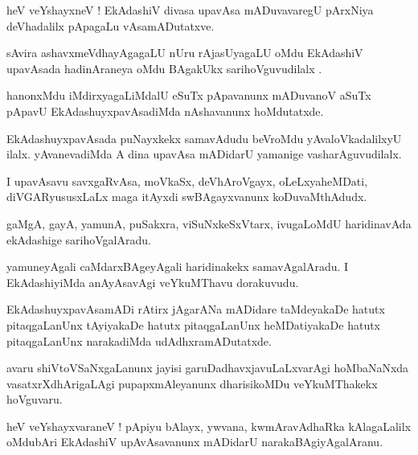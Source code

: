 \documentclass{article}
\begin{document}
\begin{mn}
heV veYshayxneV ! EkAdashiV divasa upavAsa mADuvavaregU pArxNiya deVhadalilx pApagaLu 
vAsamADutatxve.
\end{mn}

\begin{mn}
sAvira ashavxmeVdhayAgagaLU nUru rAjasUyagaLU oMdu EkAdashiV upavAsada hadinAraneya oMdu BAgakUkx 
sarihoVguvudilalx .
\end{mn}

\begin{mn}
hanonxMdu iMdirxyagaLiMdalU eSuTx pApavanunx mADuvanoV aSuTx pApavU EkAdashuyxpavAsadiMda 
nAshavanunx hoMdutatxde.
\end{mn}

\begin{mn}
EkAdashuyxpavAsada puNayxkekx samavAdudu beVroMdu yAvaloVkadalilxyU ilalx. yAvanevadiMda A dina
upavAsa mADidarU yamanige vasharAguvudilalx.
\end{mn}

\begin{mn}
I upavAsavu savxgaRvAsa, moVkaSx, deVhAroVgayx, oLeLxyaheMDati, diVGARyususxLaLx maga itAyxdi 
swBAgayxvanunx koDuvaMthAdudx.
\end{mn}

\begin{mn}
gaMgA, gayA, yamunA, puSakxra, viSuNxkeSxVtarx, ivugaLoMdU haridinavAda ekAdashige sarihoVgalAradu.
\end{mn}


\begin{mn}
yamuneyAgali caMdarxBAgeyAgali haridinakekx samavAgalAradu. I EkAdashiyiMda anAyAsavAgi veYkuMThavu 
dorakuvudu.
\end{mn}

\begin{mn}
EkAdashuyxpavAsamADi rAtirx jAgarANa mADidare taMdeyakaDe hatutx pitaqgaLanUnx tAyiyakaDe hatutx 
pitaqgaLanUnx heMDatiyakaDe hatutx pitaqgaLanUnx narakadiMda udAdhxramADutatxde.
\end{mn}

\begin{mn}
avaru shiVtoVSaNxgaLanunx jayisi garuDadhavxjavuLaLxvarAgi hoMbaNaNxda vasatxrXdhArigaLAgi
pupapxmAleyanunx  dharisikoMDu veYkuMThakekx hoVguvaru.
\end{mn}

\begin{mn}
heV veYshayxvaraneV ! pApiyu bAlayx, ywvana, kwmAravAdhaRka kAlagaLalilx  oMdubAri EkAdashiV 
upAvAsavanunx mADidarU narakaBAgiyAgalAranu.
\end{mn}
\end{document}
